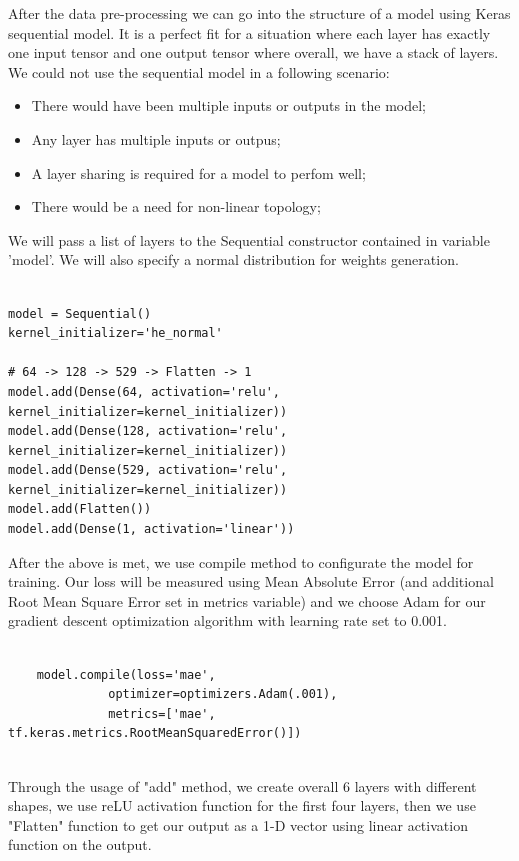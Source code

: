 \documentclass[a4paper,oneside,openright,11pt]{book}
\begin{document}
After the data pre-processing we can go into the structure of a model using Keras sequential model. It is a perfect fit for a situation where each layer has exactly one input tensor and one output tensor where overall, we have a stack of layers. We could not use the sequential model in a following scenario:

\begin{itemize}
    \item There would have been multiple inputs or outputs in the model;
    \item Any layer has multiple inputs or outpus;
    \item A layer sharing is required for a model to perfom well;
    \item There would be a need for non-linear topology;
\end{itemize}


\noindent
We will pass a list of layers to the Sequential constructor contained in variable 'model'. We will also specify a normal distribution for weights generation.

\begin{verbatim}

model = Sequential()
kernel_initializer='he_normal'

# 64 -> 128 -> 529 -> Flatten -> 1
model.add(Dense(64, activation='relu', kernel_initializer=kernel_initializer))
model.add(Dense(128, activation='relu', kernel_initializer=kernel_initializer))
model.add(Dense(529, activation='relu', kernel_initializer=kernel_initializer))
model.add(Flatten())
model.add(Dense(1, activation='linear'))
\end{verbatim}


After the above is met, we use compile method to configurate the model for training. Our loss will be measured using Mean Absolute Error (and additional Root Mean Square Error set in metrics variable) and we choose Adam for our gradient descent optimization algorithm with learning rate set to 0.001.

\begin{verbatim}
    
    model.compile(loss='mae',
              optimizer=optimizers.Adam(.001),
              metrics=['mae', tf.keras.metrics.RootMeanSquaredError()])
    
\end{verbatim}




Through the usage of "add" method, we create overall 6 layers with different shapes, we use reLU activation function for the first four layers, then we use "Flatten" function to get our output as a 1-D vector using linear activation function on the output. 
\end{document}
